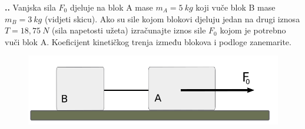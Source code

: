 


\noindent 
\textbf{
\thecjelina.\thezadatak.}
Vanjska sila $F_0$ djeluje na blok A mase $m_A= 5\ kg$ koji vuče blok B mase $m_B= 3\ kg$ (vidjeti skicu). Ako su sile kojom blokovi djeluju jedan na drugi iznosa $T=18,75\ N$ (sila napetosti užeta) izračunajte iznos sile $F_0$ kojom je potrebno vuči blok A. Koeficijent kinetičkog trenja između blokova i podloge zanemarite.


\begin{figure}[h]%
  \begin{center}
    \includegraphics[scale=0.30]{../03_Dinamika_materijalne_tocke/Zadatak_D301.png}
  \end{center}
\end{figure}


